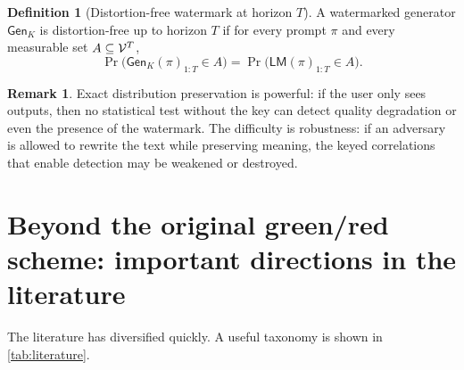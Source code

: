 \documentclass[11pt]{article}
\theoremstyle{definition}
\newtheorem{definition}[theorem]{Definition}
\newtheorem{remark}[theorem]{Remark}
\newcommand{\PrK}{\Pr}
\newcommand{\1}{\mathbf{1}}
\begin{document}
\begin{definition}[Distortion-free watermark at horizon $T$]
A watermarked generator $\mathsf{Gen}_K$ is distortion-free up to horizon $T$ if for every prompt $\pi$ and every measurable set $A\subseteq {\cal V}^T$,
\[
\PrK\bigl(\mathsf{Gen}_K(\pi)_{1:T}\in A\bigr)
=
\PrK\bigl(\mathsf{LM}(\pi)_{1:T}\in A\bigr).
\]
\end{definition}

\begin{remark}
Exact distribution preservation is powerful: if the user only sees outputs, then no statistical test without the key can detect quality degradation or even the presence of the watermark. The difficulty is robustness: if an adversary is allowed to rewrite the text while preserving meaning, the keyed correlations that enable detection may be weakened or destroyed.
\end{remark}

\section{Beyond the original green/red scheme: important directions in the literature}

The literature has diversified quickly. A useful taxonomy is shown in \cref{tab:literature}.
\end{document}
